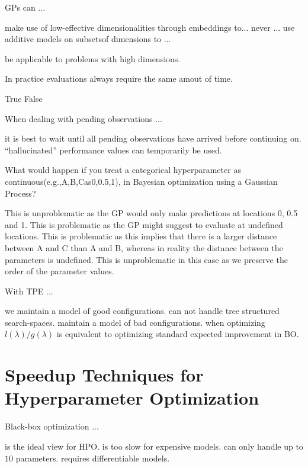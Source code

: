 \documentclass{exam}
\begin{document}
\begin{questions}
		\question GPs can ...
		\begin{choices}
			\choice make use of low-effective dimensionalities through embeddings to... %
			\choice never ...
			\choice use additive models on subsetsof dimensions to ... %
		\end{choices}
		be applicable to problems with high dimensions.
		
		\question In practice evaluations always require the same amout of time.
		\begin{choices}
			\choice True
			\choice False
		\end{choices}
		
		\question When dealing with pending observations ...
		\begin{choices}
			\choice it is best to wait until all pending observations have arrived before continuing on.
			\choice ``hallucinated'' performance values can temporarily be used. %
		\end{choices}
		
		\question What would happen if you treat a categorical hyperparameter as continuous(e.g.,{A,B,C}as{0,0.5,1}), in Bayesian optimization using a Gaussian Process?
		\begin{choices}
			\choice This is unproblematic as the GP would only make predictions at locations 0, 0.5 and 1.
			\choice This is problematic as the GP might suggest to evaluate at undefined locations. %
			\choice This is problematic as this implies that there is a larger distance between A and C than A and B, whereas in reality the distance between the parameters is undefined. %
			\choice This is unproblematic in this case as we preserve the order of the parameter values.
		\end{choices}
		
		\question With TPE ...
		\begin{choices}
			\choice we maintain a model of good configurations. %
			\choice can not handle tree structured search-spaces.
			\choice maintain a model of bad configurations. %
			\choice when optimizing $l(\lambda)/g(\lambda)$ is equivalent to optimizing standard expected improvement in BO. %
		\end{choices}


\clearpage
\section{Speedup Techniques for Hyperparameter Optimization}
\question Black-box optimization ...
\begin{choices}
    \choice is the ideal view for HPO.
    \choice is too slow for expensive models. %
    \choice can only handle up to $10$ parameters.
    \choice requires differentiable models.
\end{choices}


\end{questions}
\end{document}
